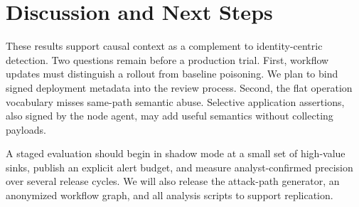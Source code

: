 \section{Discussion and Next Steps}
\label{sec:discussion}

These results support causal context as a complement to identity-centric
detection. Two questions remain before a production trial. First, workflow
updates must distinguish a rollout from baseline poisoning. We plan to bind
signed deployment metadata into the review process. Second, the flat operation
vocabulary misses same-path semantic abuse. Selective application assertions,
also signed by the node agent, may add useful semantics without collecting
payloads.

A staged evaluation should begin in shadow mode at a small set of high-value
sinks, publish an explicit alert budget, and measure analyst-confirmed precision
over several release cycles. We will also release the attack-path generator,
an anonymized workflow graph, and all analysis scripts to support replication.

